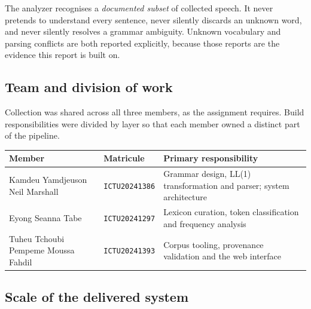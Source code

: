 \begin{keypoint}
The analyzer recognises a \emph{documented subset} of collected speech. It never pretends
to understand every sentence, never silently discards an unknown word, and never silently
resolves a grammar ambiguity. Unknown vocabulary and parsing conflicts are both reported
explicitly, because those reports are the evidence this report is built on.
\end{keypoint}

\subsection{Team and division of work}

Collection was shared across all three members, as the assignment requires. Build
responsibilities were divided by layer so that each member owned a distinct part of the
pipeline.

\begin{center}
\small
\begin{tabular}{@{}p{5.1cm} l p{5.4cm}@{}}
\toprule
\textbf{Member} & \textbf{Matricule} & \textbf{Primary responsibility} \\
\midrule
Kamdeu Yamdjeuson Neil Marshall & \texttt{ICTU20241386} &
  Grammar design, LL(1) transformation and parser; system architecture \\
\addlinespace
Eyong Seanna Tabe & \texttt{ICTU20241297} &
  Lexicon curation, token classification and frequency analysis \\
\addlinespace
Tuheu Tchoubi Pempeme Moussa Fahdil & \texttt{ICTU20241393} &
  Corpus tooling, provenance validation and the web interface \\
\bottomrule
\end{tabular}
\end{center}

\subsection{Scale of the delivered system}


